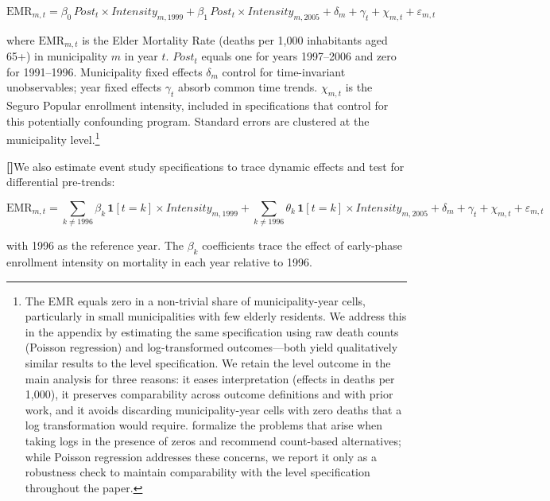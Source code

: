 \documentclass[12pt]{article}
\newcounter{paragraphnum}
\newcommand{\p}{\refstepcounter{paragraphnum}\textbf{[\theparagraphnum]}\enspace}
\begin{document}
\begin{equation}\label{eq:did}
\text{EMR}_{m,t}
= \beta_{0}\,\textit{Post}_{t}\times\textit{Intensity}_{m,1999}
+ \beta_{1}\,\textit{Post}_{t}\times\textit{Intensity}_{m,2005}
+ \delta_{m} + \gamma_{t} + \chi_{m,t} + \varepsilon_{m,t}
\end{equation}

\noindent where $\text{EMR}_{m,t}$ is the Elder Mortality Rate (deaths per 1,000 inhabitants aged 65+) in municipality $m$ in year $t$. $\textit{Post}_{t}$ equals one for years 1997--2006 and zero for 1991--1996. Municipality fixed effects $\delta_{m}$ control for time-invariant unobservables; year fixed effects $\gamma_{t}$ absorb common time trends. $\chi_{m,t}$ is the Seguro Popular enrollment intensity, included in specifications that control for this potentially confounding program. Standard errors are clustered at the municipality level.\footnote{The EMR equals zero in a non-trivial share of municipality-year cells, particularly in small municipalities with few elderly residents. We address this in the appendix by estimating the same specification using raw death counts (Poisson regression) and log-transformed outcomes—both yield qualitatively similar results to the level specification. We retain the level outcome in the main analysis for three reasons: it eases interpretation (effects in deaths per 1,000), it preserves comparability across outcome definitions and with prior work, and it avoids discarding municipality-year cells with zero deaths that a log transformation would require. \cite{ChenRoth2024QJE} formalize the problems that arise when taking logs in the presence of zeros and recommend count-based alternatives; while Poisson regression addresses these concerns, we report it only as a robustness check to maintain comparability with the level specification throughout the paper.}

\p We also estimate event study specifications to trace dynamic effects and test for differential pre-trends:

\begin{equation}\label{eq:eventstudy}
\text{EMR}_{m,t}
= \sum_{k \neq 1996} \beta_{k}\,\mathbf{1}[t=k]\times\textit{Intensity}_{m,1999}
+ \sum_{k \neq 1996} \theta_{k}\,\mathbf{1}[t=k]\times\textit{Intensity}_{m,2005}
+ \delta_{m} + \gamma_{t} + \chi_{m,t} + \varepsilon_{m,t}
\end{equation}

\noindent with 1996 as the reference year. The $\beta_{k}$ coefficients trace the effect of early-phase enrollment intensity on mortality in each year relative to 1996.
\end{document}
